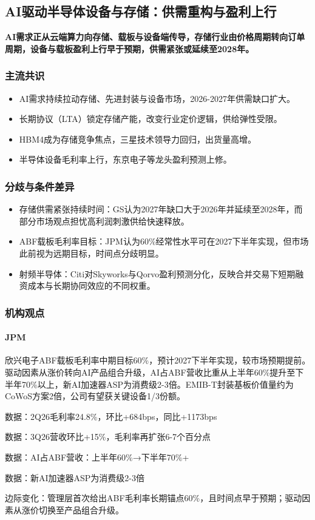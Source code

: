 \documentclass[11pt]{ctexart}
\begin{document}
\subsection{AI驱动半导体设备与存储：供需重构与盈利上行}
\textbf{AI需求正从云端算力向存储、载板与设备端传导，存储行业由价格周期转向订单周期，设备与载板盈利上行早于预期，供需紧张或延续至2028年。}
\subsubsection*{主流共识}
\begin{itemize}
  \item AI需求持续拉动存储、先进封装与设备市场，2026-2027年供需缺口扩大。
  \item 长期协议（LTA）锁定存储产能，改变行业定价逻辑，供给弹性受限。
  \item HBM4成为存储竞争焦点，三星技术领导力回归，出货量高增。
  \item 半导体设备毛利率上行，东京电子等龙头盈利预测上修。
\end{itemize}
\subsubsection*{分歧与条件差异}
\begin{itemize}
  \item 存储供需紧张持续时间：GS认为2027年缺口大于2026年并延续至2028年，而部分市场观点担忧高利润刺激供给快速释放。
  \item ABF载板毛利率目标：JPM认为60\%经常性水平可在2027下半年实现，但市场此前视为远期目标，时间点分歧明显。
  \item 射频半导体：Citi对Skyworks与Qorvo盈利预测分化，反映合并交易下短期融资成本与长期协同效应的不同权重。
\end{itemize}
\subsubsection*{机构观点}
\paragraph{JPM} 欣兴电子ABF载板毛利率中期目标60\%，预计2027下半年实现，较市场预期提前。驱动因素从涨价转向AI产品组合升级，AI占ABF营收比重从上半年60\%提升至下半年70\%以上，新AI加速器ASP为消费级2-3倍。EMIB-T封装基板价值量约为CoWoS方案2倍，公司有望获关键设备1/3份额。
{\small\color{refgray}数据：2Q26毛利率24.8\%，环比+684bps，同比+1173bps\par}
{\small\color{refgray}数据：3Q26营收环比+15\%，毛利率再扩张6-7个百分点\par}
{\small\color{refgray}数据：AI占ABF营收：上半年60\%→下半年70\%+\par}
{\small\color{refgray}数据：新AI加速器ASP为消费级2-3倍\par}
{\small\color{refgray}边际变化：管理层首次给出ABF毛利率长期锚点60\%，且时间点早于预期；驱动因素从涨价切换至产品组合升级。\par}
\end{document}
